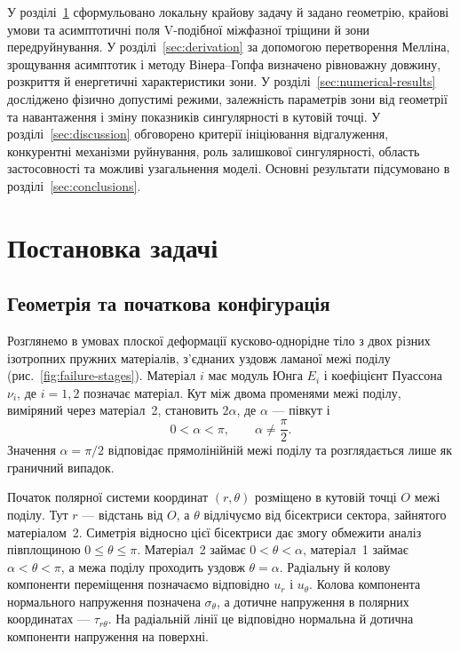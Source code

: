 У розділі~\ref{sec:problem} сформульовано локальну крайову задачу й задано геометрію, крайові умови та асимптотичні поля V-подібної міжфазної тріщини й зони передруйнування. У розділі~\ref{sec:derivation} за допомогою перетворення Мелліна, зрощування асимптотик і методу Вінера--Гопфа визначено рівноважну довжину, розкриття й енергетичні характеристики зони. У розділі~\ref{sec:numerical-results} досліджено фізично допустимі режими, залежність параметрів зони від геометрії та навантаження і зміну показників сингулярності в кутовій точці. У розділі~\ref{sec:discussion} обговорено критерії ініціювання відгалуження, конкурентні механізми руйнування, роль залишкової сингулярності, область застосовності та можливі узагальнення моделі. Основні результати підсумовано в розділі~\ref{sec:conclusions}.

\section{Постановка задачі}
\label{sec:problem}
\providecommand{\AsymptoticsAppendix}{додатку~\ref{app:asymptotics}}

\subsection{Геометрія та початкова конфігурація}
\label{subsec:geometry}

Розглянемо в умовах плоскої деформації кусково-однорідне тіло з двох різних ізотропних пружних матеріалів, з’єднаних уздовж ламаної межі поділу (рис.~\ref{fig:failure-stages}). Матеріал $i$ має модуль Юнга $E_i$ і коефіцієнт Пуассона $\nu_i$, де $i=1,2$ позначає матеріал. Кут між двома променями межі поділу, виміряний через матеріал~2, становить $2\alpha$, де $\alpha$ — півкут і
\begin{equation*}
  0<\alpha<\pi, \qquad \alpha\ne\frac{\pi}{2}.
\end{equation*}
Значення $\alpha=\pi/2$ відповідає прямолінійній межі поділу та розглядається лише як граничний випадок.

Початок полярної системи координат $(r,\theta)$ розміщено в кутовій точці $O$ межі поділу. Тут $r$ — відстань від $O$, а $\theta$ відлічуємо від бісектриси сектора, зайнятого матеріалом~2. Симетрія відносно цієї бісектриси дає змогу обмежити аналіз півплощиною $0\leq\theta\leq\pi$. Матеріал~2 займає $0<\theta<\alpha$, матеріал~1 займає $\alpha<\theta<\pi$, а межа поділу проходить уздовж $\theta=\alpha$. Радіальну й колову компоненти переміщення позначаємо відповідно $u_r$ і $u_\theta$. Колова компонента нормального напруження позначена $\sigma_\theta$, а дотичне напруження в полярних координатах — $\tau_{r\theta}$. На радіальній лінії це відповідно нормальна й дотична компоненти напруження на поверхні.

